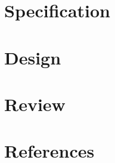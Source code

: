 \documentclass[12pt]{article}
\begin{document}

\restoregeometry

% 

\setcounter{tocdepth}{5}
\tableofcontents
\pagebreak


\justify

% 

\section{Specification}


\section{Design}


\section{Review} %



\section{References}
\label{sec:ref}
\printbibliography[heading=none]
\end{document}

